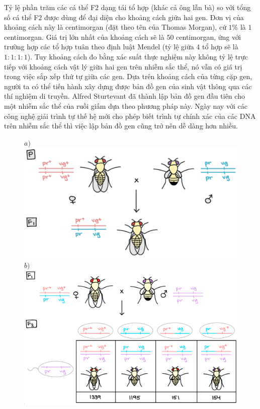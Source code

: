 \begin{multicols}{2}
	Tỷ lệ phần trăm các cá thể F$2$ dạng tái tổ hợp (khác cả ông lẫn bà) so với tổng số cá thể F$2$ được dùng để đại diện cho khoảng cách giữa hai gen. Đơn vị của khoảng cách này là centimorgan (đặt theo tên của Thomas Morgan), cứ $1\%$ là $1$ centimorgan. Giá trị lớn nhất của khoảng cách sẽ là $50$ centimorgan, ứng với trường hợp các tổ hợp tuân theo định luật Mendel (tỷ lệ giữa $4$ tổ hợp sẽ là $1 : 1 : 1 : 1$).
	\vskip 0.1cm
	Tuy khoảng cách đo bằng xác suất thực nghiệm này không tỷ lệ trực tiếp với khoảng cách vật lý giữa hai gen trên nhiễm sắc thể, nó vẫn có giá trị trong việc sắp xếp thứ tự giữa các gen. Dựa trên khoảng cách của từng cặp gen, người ta có thể tiến hành xây dựng được bản đồ gen của sinh vật thông qua các thí nghiệm di truyền. Alfred Sturtevant đã thành lập bản đồ gen đầu tiên cho một nhiễm sắc thể của ruồi giấm dựa theo phương pháp này.
	\vskip 0.1cm
	Ngày nay với các công nghệ giải trình tự thế hệ mới cho phép biết trình tự chính xác của các DNA trên nhiễm sắc thể thì việc lập bản đồ gen cũng trở nên dễ dàng hơn nhiều.
	\begin{figure}[H]
		\centering
		\vspace*{5pt}
		\captionsetup{labelformat= empty, justification=centering}
		$a)$\includegraphics[width=0.95\linewidth]{image009}
		$b)$\includegraphics[width=0.95\linewidth]{image010}

\end{figure}
\end{multicols}
